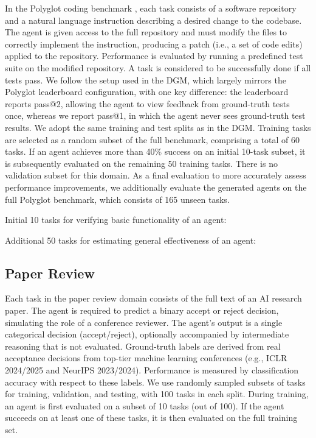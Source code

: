 \documentclass[]{fairmeta}
\begin{document}
In the Polyglot coding benchmark \citep{gauthier2024polyglot}, each task consists of a software repository and a natural language instruction describing a desired change to the codebase. The agent is given access to the full repository and must modify the files to correctly implement the instruction, producing a patch (i.e., a set of code edits) applied to the repository. Performance is evaluated by running a predefined test suite on the modified repository. A task is considered to be successfully done if all tests pass. We follow the setup used in the DGM, which largely mirrors the Polyglot leaderboard configuration, with one key difference: the leaderboard reports pass@2, allowing the agent to view feedback from ground-truth tests once, whereas we report pass@1, in which the agent never sees ground-truth test results. We adopt the same training and test splits as in the DGM. Training tasks are selected as a random subset of the full benchmark, comprising a total of 60 tasks. If an agent achieves more than 40\% success on an initial 10-task subset, it is subsequently evaluated on the remaining 50 training tasks. There is no validation subset for this domain. As a final evaluation to more accurately assess performance improvements, we additionally evaluate the generated agents on the full Polyglot benchmark, which consists of 165 unseen tasks.


Initial 10 tasks for verifying basic functionality of an agent:

Additional 50 tasks for estimating general effectiveness of an agent:


\subsection{Paper Review}
\label{app:domain-paperreview}

Each task in the paper review domain consists of the full text of an AI research paper. The agent is required to predict a binary accept or reject decision, simulating the role of a conference reviewer. The agent's output is a single categorical decision (accept/reject), optionally accompanied by intermediate reasoning that is not evaluated. Ground-truth labels are derived from real acceptance decisions from top-tier machine learning conferences (e.g., ICLR 2024/2025 and NeurIPS 2023/2024). Performance is measured by classification accuracy with respect to these labels.
We use randomly sampled subsets of tasks for training, validation, and testing, with 100 tasks in each split. During training, an agent is first evaluated on a subset of 10 tasks (out of 100). If the agent succeeds on at least one of these tasks, it is then evaluated on the full training set.
\end{document}
